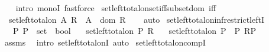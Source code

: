 \begin{isabellebody}
%
\isadelimproof
\ \ %
\endisadelimproof
%
\isatagproof
{}\isamarkupfalse%
\ {\isacharparenleft}{\kern0pt}intro\ monoI{\isacharparenright}{\kern0pt}\ fastforce%
\endisatagproof
{\isafoldproof}%
%
\isadelimproof
\isanewline
%
\endisadelimproof
\isanewline
{}\isamarkupfalse%
\ set{\isacharunderscore}{\kern0pt}left{\isacharunderscore}{\kern0pt}total{\isacharunderscore}{\kern0pt}on{\isacharunderscore}{\kern0pt}set{\isacharunderscore}{\kern0pt}iff{\isacharunderscore}{\kern0pt}subset{\isacharunderscore}{\kern0pt}dom\ {\isacharbrackleft}{\kern0pt}iff{\isacharbrackright}{\kern0pt}{\isacharcolon}{\kern0pt}\isanewline
\ \ {\isachardoublequoteopen}set{\isacharunderscore}{\kern0pt}left{\isacharunderscore}{\kern0pt}total{\isacharunderscore}{\kern0pt}on\ A\ R\ {\isasymlongleftrightarrow}\ A\ {\isasymsubseteq}\ dom\ R{\isachardoublequoteclose}\isanewline
%
\isadelimproof
\ \ %
\endisadelimproof
%
\isatagproof
{}\isamarkupfalse%
\ auto%
\endisatagproof
{\isafoldproof}%
%
\isadelimproof
\isanewline
%
\endisadelimproof
\isanewline
{}\isamarkupfalse%
\ set{\isacharunderscore}{\kern0pt}left{\isacharunderscore}{\kern0pt}total{\isacharunderscore}{\kern0pt}on{\isacharunderscore}{\kern0pt}inf{\isacharunderscore}{\kern0pt}restrict{\isacharunderscore}{\kern0pt}leftI{\isacharcolon}{\kern0pt}\isanewline
\ \ \ P\ P{\isacharprime}{\kern0pt}\ {\isacharcolon}{\kern0pt}{\isacharcolon}{\kern0pt}\ {\isachardoublequoteopen}set\ {\isasymRightarrow}\ bool{\isachardoublequoteclose}\isanewline
\ \ \ {\isachardoublequoteopen}set{\isacharunderscore}{\kern0pt}left{\isacharunderscore}{\kern0pt}total{\isacharunderscore}{\kern0pt}on\ P\ R{\isachardoublequoteclose}\isanewline
\ \ \ {\isachardoublequoteopen}set{\isacharunderscore}{\kern0pt}left{\isacharunderscore}{\kern0pt}total{\isacharunderscore}{\kern0pt}on\ {\isacharparenleft}{\kern0pt}P\ {\isasymsqinter}\ P{\isacharprime}{\kern0pt}{\isacharparenright}{\kern0pt}\ R{\isasymrestriction}\isactrlbsub P{\isacharprime}{\kern0pt}\isactrlesub {\isachardoublequoteclose}\isanewline
%
\isadelimproof
\ \ %
\endisadelimproof
%
\isatagproof
{}\isamarkupfalse%
\ assms\ \isamarkupfalse%
\ {\isacharparenleft}{\kern0pt}intro\ set{\isacharunderscore}{\kern0pt}left{\isacharunderscore}{\kern0pt}total{\isacharunderscore}{\kern0pt}onI{\isacharparenright}{\kern0pt}\ auto%
\endisatagproof
{\isafoldproof}%
%
\isadelimproof
\isanewline
%
\endisadelimproof
\isanewline
{}\isamarkupfalse%
\ set{\isacharunderscore}{\kern0pt}left{\isacharunderscore}{\kern0pt}total{\isacharunderscore}{\kern0pt}on{\isacharunderscore}{\kern0pt}compI{\isacharcolon}{\kern0pt}\isanewline

\end{isabellebody}
